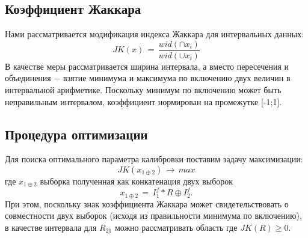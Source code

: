 \subsection{Коэффициент Жаккара}
\begin{flushleft}
	Нами рассматривается модификация индекса Жаккара для интервальных данных:
	\begin{equation}
		JK(x)\,=\,\frac{wid(\cap{x_i})}{wid(\cup{x_i})}
		\label{13}
	\end{equation}
	В качестве меры рассматривается ширина интервала, а вместо пересечения и объединения $-$ взятие минимума и максимума по включению двух величин в интервальной арифметике. Поскольку минимум по включению может быть неправильным интервалом, коэффициент нормирован на промежутке [-1;1].
\end{flushleft}

\subsection{Процедура оптимизации}
\begin{flushleft}
	Для поиска оптимального параметра калибровки поставим задачу максимизации:
	\begin{equation}
		JK(x_{1\oplus2})\,\rightarrow\, max
		\label{14}
	\end{equation}
	где $x_{1\oplus2}$ выборка полученная как конкатенация двух выборок
	\begin{equation}
		x_{1\oplus2}\,=\, I_1^f*R \oplus I_2^f.
		\label{15}
	\end{equation}
	При этом, поскольку знак коэффициента Жаккара может свидетельствовать о совместности двух выборок (исходя из правильности минимума по включению), в качестве интервала для $R_{21}$ можно рассматривать область где $JK(R)\geq0$.
\end{flushleft}